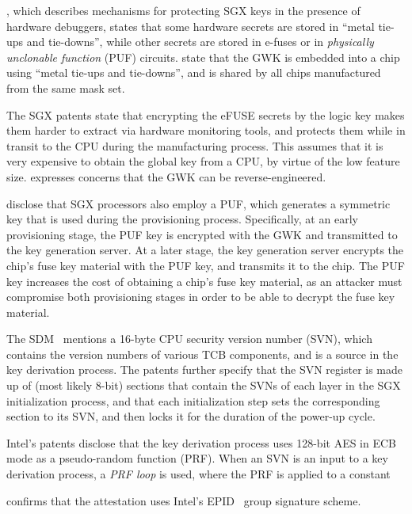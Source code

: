 \cite{shanbhogue2015gdxcsgx}, which describes mechanisms for protecting SGX
keys in the presence of hardware debuggers, states that some hardware secrets
are stored in ``metal tie-ups and tie-downs'', while other secrets are stored
in e-fuses or in \textit{physically unclonable function} (PUF) circuits.
\cite{brickell2014hardening, gotze2014provisioning} state that the GWK is
embedded into a chip using ``metal tie-ups and tie-downs'', and is shared by
all chips manufactured from the same mask set.

The SGX patents state that encrypting the eFUSE secrets by the logic key makes
them harder to extract via hardware monitoring tools, and protects them while
in transit to the CPU during the manufacturing process. This assumes that it is
very expensive to obtain the global key from a CPU, by virtue of the low
feature size. \cite{gotze2014provisioning} expresses concerns that the GWK can
be reverse-engineered.

\cite{gotze2014provisioning, gotze2014provisioning2} disclose that SGX
processors also employ a PUF, which generates a symmetric key that is used
during the provisioning process.  Specifically, at an early provisioning stage,
the PUF key is encrypted with the GWK and transmitted to the key generation
server. At a later stage, the key generation server encrypts the chip's fuse
key material with the PUF key, and transmits it to the chip. The PUF key
increases the cost of obtaining a chip's fuse key material, as an attacker must
compromise both provisioning stages in order to be able to decrypt the fuse key
material.

The SDM~\cite{intel2015sdm} mentions a 16-byte CPU security version number
(SVN), which contains the version numbers of various TCB components, and is a
source in the key derivation process. The patents further specify that the SVN
register is made up of (most likely 8-bit) sections that contain the SVNs of
each layer in the SGX initialization process, and that each initialization step
sets the corresponding section to its SVN, and then locks it for the duration
of the power-up cycle.

Intel's patents disclose that the key derivation process uses 128-bit AES in
ECB mode as a pseudo-random function (PRF). When an SVN is an input to a key
derivation process, a \textit{PRF loop} is used, where the PRF is applied to
a constant

\cite{anati2013sgx} confirms that the attestation uses Intel's
EPID~\cite{brickell2009epid} group signature scheme.

